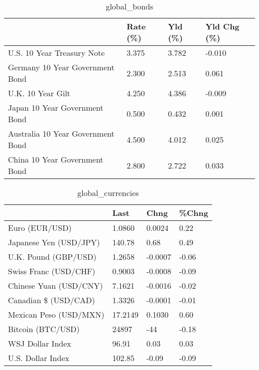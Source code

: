 \documentclass{article}%
\begin{document}
%


\begin{table}[htbp]%
\caption{global\_bonds}%
\centering%
\begin{adjustbox}{width=1\textwidth}%
\begin{tabular}{llll}
\toprule
                                  & Rate (\%) & Yld (\%) & Yld Chg (\%) \\
\midrule
       U.S. 10 Year Treasury Note &    3.375 &   3.782 &      -0.010 \\
  Germany 10 Year Government Bond &    2.300 &   2.513 &       0.061 \\
                U.K. 10 Year Gilt &    4.250 &   4.386 &      -0.009 \\
    Japan 10 Year Government Bond &    0.500 &   0.432 &       0.001 \\
Australia 10 Year Government Bond &    4.500 &   4.012 &       0.025 \\
    China 10 Year Government Bond &    2.800 &   2.722 &       0.033 \\
\bottomrule
\end{tabular}
%
\end{adjustbox}%
\end{table}

%


\begin{table}[htbp]%
\caption{global\_currencies}%
\centering%
\begin{adjustbox}{width=1\textwidth}%
\begin{tabular}{llll}
\toprule
                       &    Last &    Chng & \%Chng \\
\midrule
        Euro (EUR/USD) &  1.0860 &  0.0024 &  0.22 \\
Japanese Yen (USD/JPY) &  140.78 &    0.68 &  0.49 \\
  U.K. Pound (GBP/USD) &  1.2658 & -0.0007 & -0.06 \\
 Swiss Franc (USD/CHF) &  0.9003 & -0.0008 & -0.09 \\
Chinese Yuan (USD/CNY) &  7.1621 & -0.0016 & -0.02 \\
  Canadian \$ (USD/CAD) &  1.3326 & -0.0001 & -0.01 \\
Mexican Peso (USD/MXN) & 17.2149 &  0.1030 &  0.60 \\
     Bitcoin (BTC/USD) &   24897 &     -44 & -0.18 \\
      WSJ Dollar Index &   96.91 &    0.03 &  0.03 \\
     U.S. Dollar Index &  102.85 &   -0.09 & -0.09 \\
\bottomrule
\end{tabular}
%
\end{adjustbox}%
\end{table}
\end{document}

